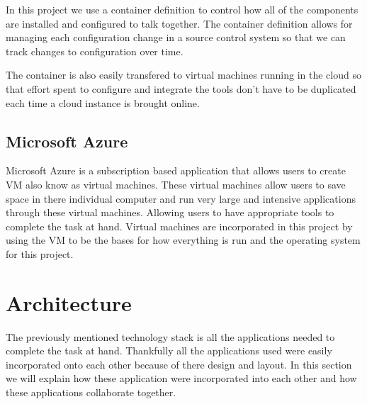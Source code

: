 \documentclass[conference,twoside]{IEEEtran}
\begin{document}
In this project we use a container definition to control how all of the components are installed and configured to talk together. The container definition allows for managing each configuration change in a source control system so that we can track changes to configuration over time.

The container is also easily transfered to virtual machines running in the cloud so that effort spent to configure and integrate the tools don't have to be duplicated each time a cloud instance is brought online.

\subsection{Microsoft Azure}
Microsoft Azure is a subscription based application that allows users to create VM also know as virtual machines. These virtual machines allow users to save space in there individual computer and run very large and intensive applications through these virtual machines. Allowing users to have appropriate tools to complete the task at hand. Virtual machines are incorporated in this project by using the VM to be the bases for how everything is run and the operating system for this project\cite{azure}.


\section{Architecture}
The previously mentioned technology stack is all the applications needed to complete the task at hand. Thankfully all the applications used were easily incorporated onto each other because of there design and layout. In this section we will explain how these application were incorporated into each other and how these applications collaborate together.
\end{document}
